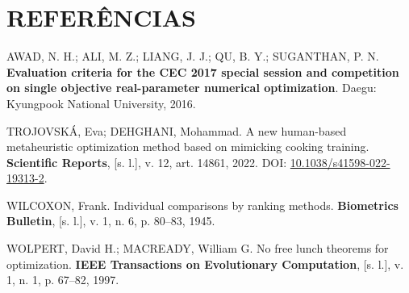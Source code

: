 \documentclass[12pt,a4paper]{article}
\begin{document}
\clearpage
\section*{REFERÊNCIAS}

\begin{singlespace}
\noindent AWAD, N. H.; ALI, M. Z.; LIANG, J. J.; QU, B. Y.; SUGANTHAN, P. N.
\textbf{Evaluation criteria for the CEC 2017 special session and competition on
single objective real-parameter numerical optimization}. Daegu: Kyungpook
National University, 2016.

\vspace{\baselineskip}

\noindent TROJOVSKÁ, Eva; DEHGHANI, Mohammad. A new human-based metaheuristic
optimization method based on mimicking cooking training. \textbf{Scientific
Reports}, [s. l.], v. 12, art. 14861, 2022. DOI:
\href{https://doi.org/10.1038/s41598-022-19313-2}{10.1038/s41598-022-19313-2}.

\vspace{\baselineskip}

\noindent WILCOXON, Frank. Individual comparisons by ranking methods.
\textbf{Biometrics Bulletin}, [s. l.], v. 1, n. 6, p. 80--83, 1945.

\vspace{\baselineskip}

\noindent WOLPERT, David H.; MACREADY, William G. No free lunch theorems for
optimization. \textbf{IEEE Transactions on Evolutionary Computation}, [s. l.],
v. 1, n. 1, p. 67--82, 1997.
\end{singlespace}
\end{document}
